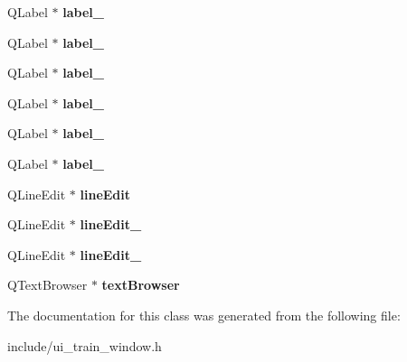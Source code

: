 \begin{DoxyCompactItemize}
Q\+Label $\ast$ {\bfseries label\+\_}
\item 
\mbox{\label{class_ui___train___window_a2a21578047f03dcfca0655ab3ef76020}} 
Q\+Label $\ast$ {\bfseries label\+\_}
\item 
\mbox{\label{class_ui___train___window_a21e15aaf3a9ef0986bdab9bfa8d27bb8}} 
Q\+Label $\ast$ {\bfseries label\+\_}
\item 
\mbox{\label{class_ui___train___window_ae71bb145c2c2e58ef5f1f49423c99004}} 
Q\+Label $\ast$ {\bfseries label\+\_}
\item 
\mbox{\label{class_ui___train___window_a9c14487244fa2234badf43181b0b0a91}} 
Q\+Label $\ast$ {\bfseries label\+\_}
\item 
\mbox{\label{class_ui___train___window_af2cf8aa8bf19ffc134c3793dd1db2765}} 
Q\+Label $\ast$ {\bfseries label\+\_}
\item 
\mbox{\label{class_ui___train___window_aebbcb31aaed593bee559c765b711735d}} 
Q\+Line\+Edit $\ast$ {\bfseries line\+Edit}
\item 
\mbox{\label{class_ui___train___window_ac1111c295bdb26c77ecc1c8625e07930}} 
Q\+Line\+Edit $\ast$ {\bfseries line\+Edit\+\_}
\item 
\mbox{\label{class_ui___train___window_a8c194e06700eb46441ff0954fad0490f}} 
Q\+Line\+Edit $\ast$ {\bfseries line\+Edit\+\_}
\item 
\mbox{\label{class_ui___train___window_a9afe2f1c4fcfabd5fdad2201b05c3aa3}} 
Q\+Text\+Browser $\ast$ {\bfseries text\+Browser}
\end{DoxyCompactItemize}


The documentation for this class was generated from the following file\+:\begin{DoxyCompactItemize}
\item 
include/ui\+\_\+train\+\_\+window.\+h\end{DoxyCompactItemize}
